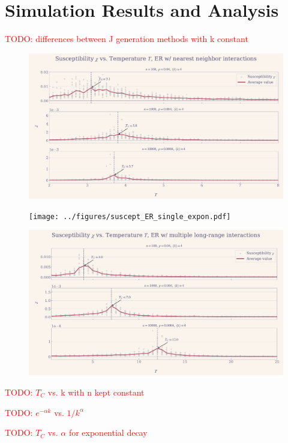 \documentclass[11pt,a4paper]{article}
\newcommand{\todo}[1]{\textcolor{red}{TODO: #1}}
\begin{document}
\section{Simulation Results and Analysis}

\todo{differences between J generation methods with k constant}

\begin{figure}[ht!]
    \includegraphics[width=\textwidth]{../figures/suscept_ER_nearest.pdf}
\end{figure}

\begin{figure}[ht!]
    \texttt{[image: ../figures/suscept\_ER\_single\_expon.pdf]}
\end{figure}

\begin{figure}[ht!]
    \includegraphics[width=\textwidth]{../figures/suscept_ER_multiple.pdf}
\end{figure}

\todo{$T_C$ vs. k with n kept constant}

\todo{$e^{-\alpha k}$ vs. $1/k^\alpha$}

\todo{$T_C$ vs. $\alpha$ for exponential decay}
\end{document}
